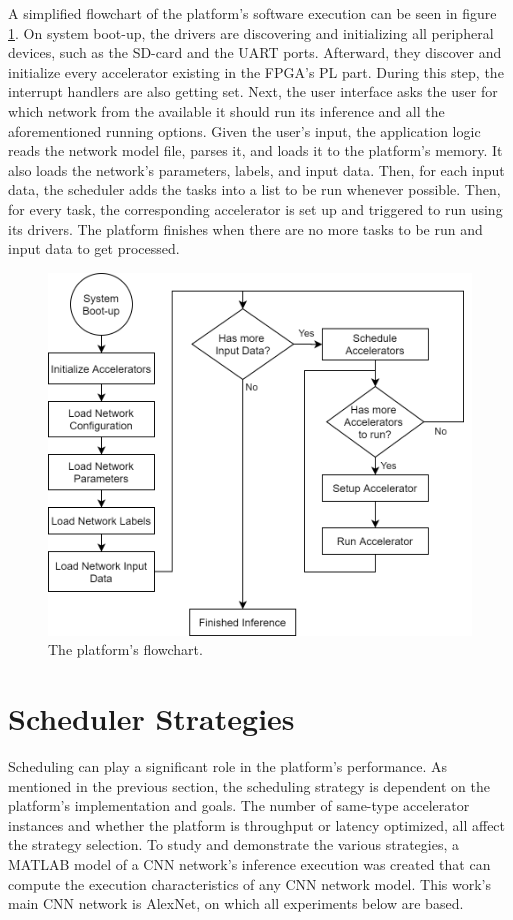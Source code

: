 A simplified flowchart of the platform's software execution can be seen in figure \ref{fig:platform-flowchart}. On system boot-up, the drivers are discovering and initializing all peripheral devices, such as the SD-card and the UART ports. Afterward, they discover and initialize every accelerator existing in the FPGA's PL part. During this step, the interrupt handlers are also getting set. Next, the user interface asks the user for which network from the available it should run its inference and all the aforementioned running options. Given the user's input, the application logic reads the network model file, parses it, and loads it to the platform's memory. It also loads the network's parameters, labels, and input data. Then, for each input data, the scheduler adds the tasks into a list to be run whenever possible. Then, for every task, the corresponding accelerator is set up and triggered to run using its drivers. The platform finishes when there are no more tasks to be run and input data to get processed.

\begin{figure} [H]
	\centering
	\includegraphics[width=\textwidth]{../Images/Platform/PlatformFlowchart.png}
	\decoRule
	\caption[The platform's flowchart]{The platform's flowchart.}
	\label{fig:platform-flowchart}
\end{figure}

\section{Scheduler Strategies}
\label{sec:Scheduler-Strategies}
Scheduling can play a significant role in the platform's performance. As mentioned in the previous section, the scheduling strategy is dependent on the platform's implementation and goals. The number of same-type accelerator instances and whether the platform is throughput or latency optimized, all affect the strategy selection. To study and demonstrate the various strategies, a MATLAB model of a CNN network's inference execution was created that can compute the execution characteristics of any CNN network model. This work's main CNN network is AlexNet, on which all experiments below are based.

